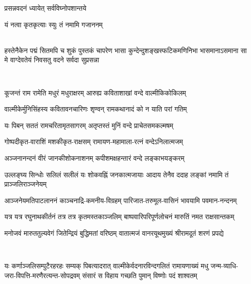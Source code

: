 

{प्रसन्नवदनं ध्यायेत् सर्वविघ्नोपशान्तये}

{यं नत्वा कृतकृत्याः स्युः तं नमामि गजाननम्}

\mbox{}\\
{हस्तेनैकेन पद्मं सितमपि च शुकं पुस्तकं चापरेण}
{भासा कुन्देन्दुशङ्खस्फटिकमणिनिभा भासमानाऽसमाना}
{सा मे वाग्देवतेयं निवसतु वदने सर्वदा सुप्रसन्ना}

\mbox{}\\

\twolineshloka
{कूजन्तं राम रामेति मधुरं मधुराक्षरम्}
{आरुह्य कविताशाखां वन्दे वाल्मीकिकोकिलम्}

\twolineshloka
{वाल्मीकेर्मुनिसिंहस्य कवितावनचारिणः}
{शृण्वन् रामकथानादं को न याति परां गतिम्}

\twolineshloka
{यः पिबन् सततं रामचरितामृतसागरम्}
{अतृप्तस्तं मुनिं वन्दे प्राचेतसमकल्मषम्}

\begin{minipage}{\linewidth}
\centering
\resetShloka
{}

\twolineshloka
{गोष्पदीकृत-वाराशिं मशकीकृत-राक्षसम्}
{रामायण-महामाला-रत्नं वन्देऽनिलात्मजम्}
\end{minipage}

\twolineshloka
{अञ्जनानन्दनं वीरं जानकीशोकनाशनम्}
{कपीशमक्षहन्तारं वन्दे लङ्काभयङ्करम्}

\twolineshloka
{उल्लङ्घ्य सिन्धोः सलिलं सलीलं यः शोकवह्निं जनकात्मजायाः}
{आदाय तेनैव ददाह लङ्कां नमामि तं प्राञ्जलिराञ्जनेयम्}

\twolineshloka
{आञ्जनेयमतिपाटलाननं काञ्चनाद्रि-कमनीय-विग्रहम्}
{पारिजात-तरुमूल-वासिनं भावयामि पवमान-नन्दनम्}

\twolineshloka
{यत्र यत्र रघुनाथकीर्तनं तत्र तत्र कृतमस्तकाञ्जलिम्}
{बाष्पवारिपरिपूर्णलोचनं मारुतिं नमत राक्षसान्तकम्}

\twolineshloka
{मनोजवं मारुततुल्यवेगं जितेन्द्रियं बुद्धिमतां वरिष्ठम्}
{वातात्मजं वानरयूथमुख्यं श्रीरामदूतं शरणं प्रपद्ये}

\mbox{}\\
\resetShloka
{}

\fourlineindentedshloka
{यः कर्णाञ्जलिसम्पुटैरहरहः सम्यक् पिबत्यादरात्}
{वाल्मीकेर्वदनारविन्दगलितं रामायणाख्यं मधु}
{जन्म-व्याधि-जरा-विपत्ति-मरणैरत्यन्त-सोपद्रवम्}
{संसारं स विहाय गच्छति पुमान् विष्णोः पदं शाश्वतम्}

